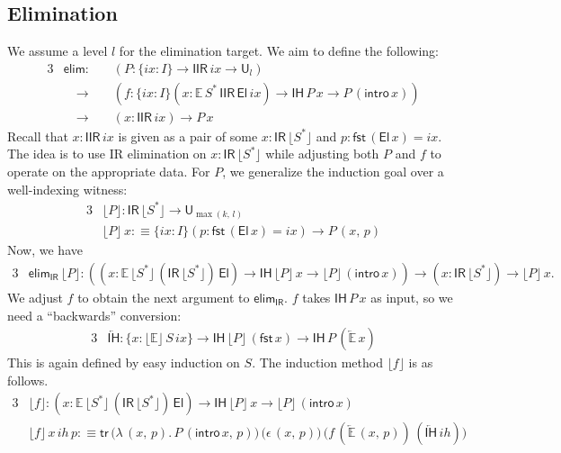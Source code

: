\documentclass[acmsmall,screen,review]{acmart}
\newcommand{\msf}[1]{{\mathsf{#1}}}
\newcommand{\mbb}[1]{\mathbb{#1}}
\newcommand{\U}{\msf{U}}
\newcommand{\El}{\msf{El}}
\newcommand{\ix}{{ix}}
\newcommand{\IR}{\msf{IR}}
\newcommand{\ih}{{ih}}
\newcommand{\intro}{\msf{intro}}
\newcommand{\IH}{\msf{IH}}
\newcommand{\elim}{\msf{elim}}
\newcommand{\tr}{\msf{tr}}
\newcommand{\fst}{\msf{fst}}
\newcommand{\IIR}{\msf{IIR}}
\newcommand{\floord}[1]{\lfloor #1 \rfloor}
\newcommand{\ola}[1]{\overleftarrow{#1}}
\newcommand{\E}{\mbb{E}}
\begin{document}
\subsection{Elimination}\label{sec:iir-construction-elimination}

We assume a level $l$ for the elimination target. We aim to define the following:
\begin{alignat*}{3}
  &\elim :\,           &&(P : \{\ix : I\}\to \IIR\,\ix \to \U_l)\\
  &                \quad\to && (f : \{\ix : I\}(x : \E\,S^*\,\IIR\,\El\,\ix) \to \IH\,P\,x \to P\,(\intro\,x))\\
  &                \quad\to && (x : \IIR\,\ix) \to P\,x
\end{alignat*}
Recall that $x : \IIR\,\ix$ is given as a pair of some $x : \IR\,\floord{S^*}$ and $p :
\fst\,(\El\,x) = \ix$.  The idea is to use IR elimination on $x : \IR\,\floord{S^*}$ while adjusting
both $P$ and $f$ to operate on the appropriate data. For $P$, we generalize the induction goal
over a well-indexing witness:
\begin{alignat*}{3}
  &\floord{P} : \IR\,\floord{S^*} \to \U_{\max(k,\,l)} \\
  &\floord{P}\,x :\equiv \{\ix : I\}(p : \fst\,(\El\,x) = \ix) \to P\,(x,\,p)
\end{alignat*}
Now, we have
\begin{alignat*}{3}
  & \elim_\IR\,\floord{P} : ((x : \E\,\floord{S^*}\,(\IR\,\floord{S^*})\,\El) \to \IH\,\floord{P}\,x \to \floord{P}\,(\intro\,x))
       \to (x : \IR\,\floord{S^*}) \to \floord{P}\,x.
\end{alignat*}
We adjust $f$ to obtain the next argument to $\elim_\IR$. $f$ takes $\IH\,P\,x$ as input,
so we need a ``backwards'' conversion:
\begin{alignat*}{3}
  & \ola{\IH} : \{x : \floord{\E}\,S\,\ix\} \to \IH\,\floord{P}\,(\fst\,x) \to \IH\,P\,(\ola{\E}\,x)
\end{alignat*}
This is again defined by easy induction on $S$. The induction method $\floord{f}$ is as follows.
\begin{alignat*}{3}
  &\floord{f} : (x : \E\,\floord{S^*}\,(\IR\,\floord{S^*})\,\El) \to \IH\,\floord{P}\,x \to \floord{P}\,(\intro\,x)\\
  &\floord{f}\,x\,\ih\,p :\equiv \tr\,\bigl(\lambda\,(x,\,p).\,P\,(\intro\,x,\,p)\bigr)\,\bigl(\epsilon\,(x,\,p)\bigr)\,
                                      \bigl(f\,(\ola{\E}\,(x,\,p))\,(\ola{\IH}\,\ih)\bigr)
\end{alignat*}
\end{document}
